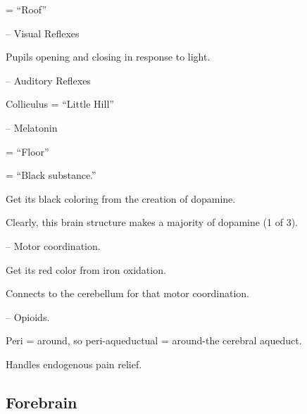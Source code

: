 \begin{coloredlist}
    \item {} = ``Roof''
    \begin{coloredlist}
        \item {} -- Visual Reflexes
        \begin{coloredlist}
            \item Pupils opening and closing in response to light.
        \end{coloredlist}
        \item {} -- Auditory Reflexes
        \item Colliculus = ``Little Hill''
        \item {} -- Melatonin
    \end{coloredlist}
    \item {} = ``Floor''
    \begin{coloredlist}
        \item {} = ``Black substance.''
        \begin{coloredlist}
            \item Get its black coloring from the creation of dopamine.
            \item Clearly, this brain structure makes a majority of dopamine (1 of 3).
        \end{coloredlist}
        \item {} -- Motor coordination.
        \begin{coloredlist}
            \item Get its red color from iron oxidation.
            \item Connects to the cerebellum for that motor coordination.
        \end{coloredlist}
        \item {} -- Opioids.
        \begin{coloredlist}
            \item Peri = around, so peri-aqueductual = around-the cerebral aqueduct.
            \item Handles endogenous pain relief.
        \end{coloredlist}
    \end{coloredlist}
\end{coloredlist}


\subsection{Forebrain}


